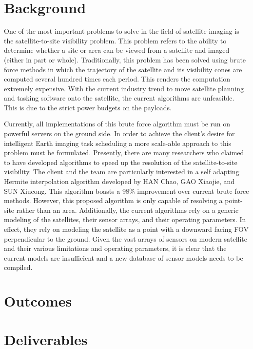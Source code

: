 \documentclass[12pt]{article}
\begin{document}
\section*{Background}
One of the most important problems to solve in the field of satellite imaging is the satellite-to-site visibility problem. This problem refers to the ability to determine whether a site or area can be viewed from a satellite and imaged (either in part or whole). Traditionally, this problem has been solved using brute force methods in which the trajectory of the satellite and its visibility cones are computed several hundred times each period. This renders the computation extremely expensive. With the current industry trend to move satellite planning and tasking software onto the satellite, the current algorithms are unfeasible. This is due to the strict power budgets on the payloads.

Currently, all implementations of this brute force algorithm must be run on powerful servers on the ground side. In order to achieve the client's desire for intelligent Earth imaging task scheduling a more scale-able approach to this problem must be formulated. Presently, there are many researchers who claimed to have developed algorithms to speed up the resolution of the satellite-to-site visibility. 
The client and the team are particularly interested in a self adapting Hermite interpolation algorithm developed by HAN Chao, GAO Xiaojie, and SUN Xiucong\cite{paper}. This algorithm boasts a 98\% improvement over current brute force methods. However, this proposed algorithm is only capable of resolving a point-site rather than an area. Additionally, the current algorithms rely on a generic modeling of the satellites, their sensor arrays, and their operating parameters. In effect, they rely on modeling the satellite as a point with a downward facing FOV perpendicular to the ground. Given the vast arrays of sensors on modern satellite and their various limitations and operating parameters, it is clear that the current models are insufficient and a new database of sensor models needs to be compiled.

\newpage
\section*{Outcomes}


\newpage
\section*{Deliverables}
\end{document}
